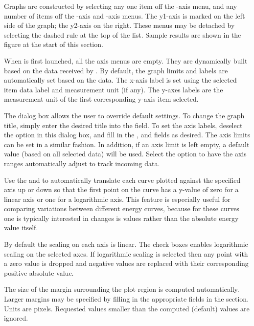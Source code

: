 Graphs are constructed by selecting any one item off the
-axis menu, and any number of items off the -axis and
-axis menus.  The y1-axis is marked on the left side of the
graph; the y2-axis on the right.  These menus may be detached by
selecting the dashed rule at the top of the list.  Sample results are
shown in the figure at the start of this section.

When  is first launched, all the axis menus are empty.
They are dynamically built based on the data received by .
By default, the graph limits and labels are automatically set based on
the data.  The x-axis label is set using the selected item data label
and measurement unit (if any).  The y-axes labels are the measurement
unit of the first corresponding y-axis item selected.

The  dialog box allows the user to
override default settings.  To change the graph title, simply enter
the desired title into the  field.  To set the axis labels,
deselect the  option in this dialog box, and fill in the
,  and  fields as desired.
The axis limits can be set in a similar fashion.  In addition, if an
axis limit is left empty, a default value (based on all selected data)
will be used.  Select the  option to have the axis
ranges automatically adjust to track incoming data.

Use the  and  to automatically
translate each curve plotted against the specified axis up or down so
that the first point on the curve has a y-value of zero for a linear
axis or one for a logarithmic axis.  This feature is especially useful
for comparing variations between different energy curves, because for
these curves one is typically interested in changes is values rather
than the absolute energy value itself.

By default the scaling on each axis is linear.  The 
check boxes enables logarithmic scaling on the selected axes.  If
logarithmic scaling is selected then any point with a zero value is
dropped and negative values are replaced with their corresponding
positive absolute value.

The size of the margin surrounding the plot region is computed
automatically.  Larger margins may be specified by filling in the
appropriate fields in the  section.  Units are
pixels.  Requested values smaller than the computed (default) values are
ignored.

